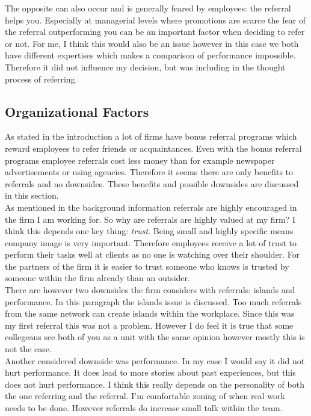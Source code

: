 \documentclass[Main.tex]{subfiles}
\begin{document}
The opposite can also occur and is generally feared by employees: the referral helps you. Especially at managerial levels where promotions are scarce the fear of the referral outperforming you can be an important factor when deciding to refer or not. For me, I think this would also be an issue however in this case we both have different expertises which makes a comparison of performance impossible. Therefore it did not influence my decision, but was including in the thought process of referring.

\subsection*{Organizational Factors}

As stated in the introduction a lot of firms have bonus referral programs which reward employees to refer friends or acquaintances. Even with the bonus referral programs employee referrals cost less money than for example newspaper advertisements or using agencies. Therefore it seems there are only benefits to referrals and no downsides. These benefits and possible downsides are discussed in this section.\\

As mentioned in the background information referrals are highly encouraged in the firm I am working for. So why are referrals are highly valued at my firm? I think this depends one key thing: \emph{trust}. Being small and highly specific means company image is very important. Therefore employees receive a lot of trust to perform their tasks well at clients as no one is watching over their shoulder. For the partners of the firm it is easier to trust someone who knows is trusted by someone within the firm already than an outsider. \\

There are however two downsides the firm considers with referrals: islands and performance. In this paragraph the islands issue is discussed. Too much referrals from the same network can create islands within the workplace. Since this was my first referral this was not a problem. However I do feel it is true that some collegeaus see both of you as a unit with the same opinion however mostly this is not the case. \\

Another considered downside was performance. In my case I would say it did not hurt performance. It does lead to more stories about past experiences, but this does not hurt performance. I think this really depends on the personality of both the one referring and the referral. I'm comfortable zoning of when real work needs to be done. However referrals do increase small talk within the team. 
\end{document}
